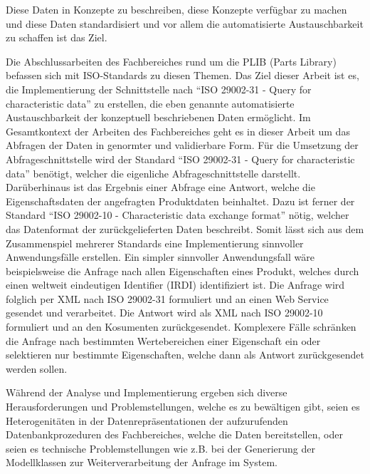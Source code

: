 Diese Daten in Konzepte zu beschreiben, diese Konzepte verfügbar zu machen und diese Daten standardisiert und vor allem die automatisierte Austauschbarkeit zu schaffen ist das Ziel. 

Die Abschlussarbeiten des Fachbereiches rund um die PLIB (Parts Library) befassen sich mit ISO-Standards zu diesen Themen. Das Ziel dieser Arbeit ist es, die Implementierung der Schnittstelle nach \enquote{ISO 29002-31 - Query for characteristic data} zu erstellen, die eben genannte automatisierte Austauschbarkeit der konzeptuell beschriebenen Daten ermöglicht. Im Gesamtkontext der Arbeiten des Fachbereiches geht es in dieser Arbeit um das Abfragen der Daten in genormter und validierbare Form. Für die Umsetzung der Abfrageschnittstelle wird der Standard \enquote{ISO 29002-31 - Query for characteristic data} benötigt, welcher die eigenliche Abfrageschnittstelle darstellt. Darüberhinaus ist das Ergebnis einer Abfrage eine Antwort, welche die Eigenschaftsdaten der angefragten Produktdaten beinhaltet. Dazu ist ferner der Standard \enquote{ISO 29002-10 - Characteristic data exchange format} nötig, welcher das Datenformat der zurückgelieferten Daten beschreibt. Somit lässt sich aus dem Zusammenspiel mehrerer Standards eine Implementierung sinnvoller Anwendungsfälle erstellen. Ein simpler sinnvoller Anwendungsfall wäre beispielsweise die Anfrage nach allen Eigenschaften eines Produkt, welches durch einen weltweit eindeutigen Identifier (IRDI) identifiziert ist. Die Anfrage wird folglich per XML nach ISO 29002-31 formuliert und an einen Web Service gesendet und verarbeitet. Die Antwort wird als XML nach ISO 29002-10 formuliert und an den Kosumenten zurückgesendet. Komplexere Fälle schränken die Anfrage nach bestimmten Wertebereichen einer Eigenschaft ein oder selektieren nur bestimmte Eigenschaften, welche dann als Antwort zurückgesendet werden sollen. 

Während der Analyse und Implementierung ergeben sich diverse Herausforderungen und Problemstellungen, welche es zu bewältigen gibt, seien es Heterogenitäten in der Datenrepräsentationen der aufzurufenden Datenbankprozeduren des Fachbereiches, welche die Daten bereitstellen, oder seien es technische Problemstellungen wie z.B. bei der Generierung der Modellklassen zur Weiterverarbeitung der Anfrage im System.  




